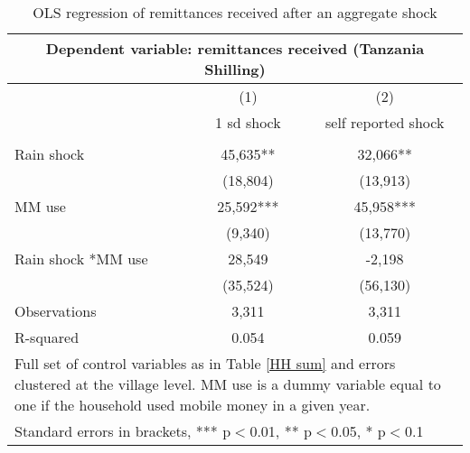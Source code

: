 \begin{table}
\centering 
\caption{OLS regression of remittances received after an aggregate shock} \label{remittance}
\begin{tabular}{lcc}
\multicolumn{3}{c}{Dependent variable: remittances received (Tanzania Shilling)} \\ \hline
 & (1) & (2)  \\
  & 1 sd shock & self reported shock \\ \hline
  &  &   \\
Rain shock & 45,635**& 32,066** \\
   & (18,804) & (13,913) \\
MM use & 25,592*** & 45,958*** \\
  & (9,340) & (13,770) \\
Rain shock *MM use & 28,549 & -2,198 \\
 & (35,524) &   (56,130) \\
Observations & 3,311 & 3,311  \\
R-squared & 0.054 & 0.059 \\ \hline
\multicolumn{3}{p{11cm}}{Full set of control variables as in Table \ref{HH sum} and errors clustered at the village level. MM use is a dummy variable equal to one if the household used mobile money in a given year.} \\
\multicolumn{3}{l}{ Standard errors in brackets, *** p$<$0.01, ** p$<$0.05, * p$<$0.1} \\
\end{tabular}
\end{table}